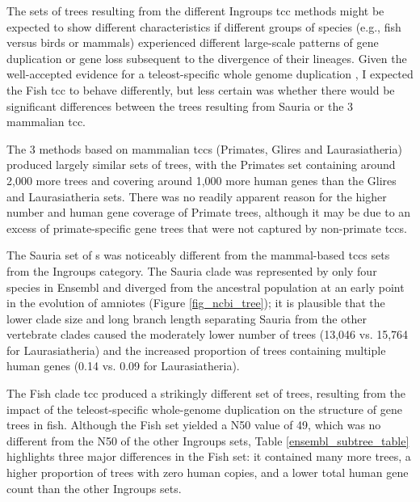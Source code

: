 The sets of trees resulting from the different Ingroups \ac{tcc}
methods might be expected to show different characteristics if
different groups of species (e.g., fish versus birds or mammals)
experienced different large-scale patterns of gene duplication or gene
loss subsequent to the divergence of their lineages. Given the
well-accepted evidence for a teleost-specific whole genome duplication
\citep{Jaillon2004}, I expected the Fish \ac{tcc} to behave
differently, but less certain was whether there would be significant differences
between the trees resulting from Sauria or the 3 mammalian \ac{tcc}.

The 3 methods based on mammalian \acp{tcc} (Primates, Glires and
Laurasiatheria) produced largely similar sets of trees, with the
Primates set containing around 2,000 more trees and covering around
1,000 more human genes than the Glires and Laurasiatheria sets. There
was no readily apparent reason for the higher number and human gene
coverage of Primate trees, although it may be due to an excess of
primate-specific gene trees that were not captured by non-primate
\acp{tcc}.

The Sauria set of \subtr{}s was noticeably different from the
mammal-based \acp{tcc} sets from the Ingroups category. The Sauria
clade was represented by only four species in Ensembl and diverged
from the \mammln ancestral population at an early point in the
evolution of amniotes (Figure \ref{fig_ncbi_tree}); it is plausible
that the lower clade size and long branch length separating Sauria
from the other vertebrate clades caused the moderately lower number of
trees (13,046 vs. 15,764 for Laurasiatheria) and the increased
proportion of trees containing multiple human genes (0.14 vs. 0.09 for
Laurasiatheria).

The Fish clade \ac{tcc} produced a strikingly different set of trees,
resulting from the impact of the teleost-specific whole-genome
duplication on the structure of gene trees in fish. Although the Fish
\subtr set yielded a N50 value of 49, which was no different from the
N50 of the other Ingroups sets, Table \ref{ensembl_subtree_table}
highlights three major differences in the Fish set: it contained many
more trees, a higher proportion of trees with zero human copies, and a
lower total human gene count than the other Ingroups sets.

